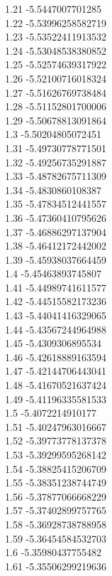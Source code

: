 {1.21	-5.5447007701285\\
1.22	-5.53996258582719\\
1.23	-5.53522411913532\\
1.24	-5.53048538380852\\
1.25	-5.52574639317922\\
1.26	-5.52100716018324\\
1.27	-5.51626769738484\\
1.28	-5.51152801700006\\
1.29	-5.50678813091864\\
1.3	-5.50204805072451\\
1.31	-5.49730778771501\\
1.32	-5.49256735291887\\
1.33	-5.48782675711309\\
1.34	-5.4830860108387\\
1.35	-5.47834512441557\\
1.36	-5.47360410795626\\
1.37	-5.46886297137904\\
1.38	-5.46412172442002\\
1.39	-5.45938037664459\\
1.4	-5.45463893745807\\
1.41	-5.44989741611577\\
1.42	-5.44515582173236\\
1.43	-5.44041416329065\\
1.44	-5.43567244964988\\
1.45	-5.4309306895534\\
1.46	-5.42618889163594\\
1.47	-5.42144706443041\\
1.48	-5.41670521637424\\
1.49	-5.41196335581533\\
1.5	-5.4072214910177\\
1.51	-5.40247963016667\\
1.52	-5.39773778137378\\
1.53	-5.39299595268142\\
1.54	-5.38825415206709\\
1.55	-5.38351238744749\\
1.56	-5.37877066668229\\
1.57	-5.37402899757765\\
1.58	-5.36928738788958\\
1.59	-5.36454584532703\\
1.6	-5.35980437755482\\
1.61	-5.35506299219636\\
}

